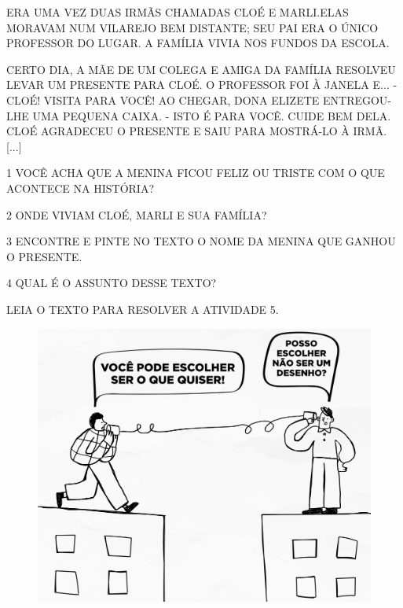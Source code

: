 
\begin{myquote}
ERA UMA VEZ DUAS IRMÃS CHAMADAS CLOÉ E MARLI.ELAS MORAVAM NUM VILAREJO
BEM DISTANTE; SEU PAI ERA O ÚNICO PROFESSOR DO LUGAR. A FAMÍLIA VIVIA
NOS FUNDOS DA ESCOLA.

CERTO DIA, A MÃE DE UM COLEGA E AMIGA DA FAMÍLIA RESOLVEU LEVAR UM
PRESENTE PARA CLOÉ. O PROFESSOR FOI À JANELA E... - CLOÉ! VISITA PARA
VOCÊ! AO CHEGAR, DONA ELIZETE ENTREGOU-LHE UMA PEQUENA CAIXA. - ISTO É
PARA VOCÊ. CUIDE BEM DELA. CLOÉ AGRADECEU O PRESENTE E SAIU PARA
MOSTRÁ-LO À IRMÃ. [...]

\end{myquote}

\num{1} VOCÊ ACHA QUE A MENINA FICOU FELIZ OU TRISTE COM O QUE ACONTECE NA HISTÓRIA?


\num{2} ONDE VIVIAM CLOÉ, MARLI E SUA FAMÍLIA?


\num{3} ENCONTRE E PINTE NO TEXTO O NOME DA MENINA QUE GANHOU O PRESENTE. 

\vspace{0.5cm}

\num{4} QUAL É O ASSUNTO DESSE TEXTO?



LEIA O TEXTO PARA RESOLVER A ATIVIDADE 5.

\begin{figure}[H]
\includegraphics[width=\textwidth]{media/image164.jpg}
\end{figure}

